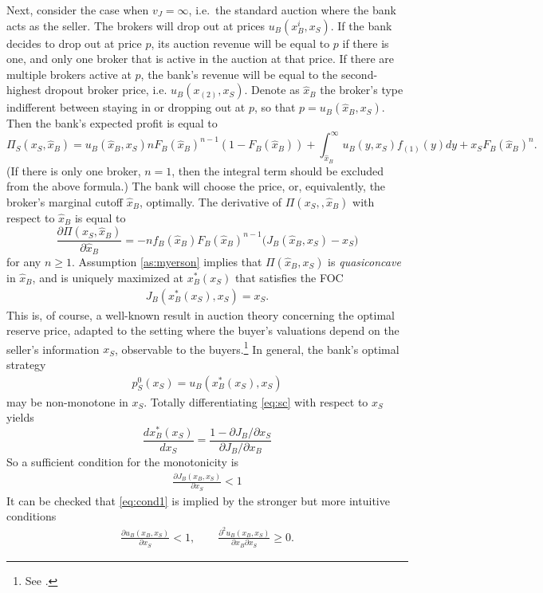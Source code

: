 \documentclass[11pt,twopage]{article}
\begin{document}
Next, consider the case when $v_J = \infty$, i.e.\ the standard auction where the bank acts as the seller. The brokers will drop out at prices $u_B(x_B^i,x_S)$. If the bank decides to drop out at price $p$, its auction revenue will be equal to $p$ if there is one, and only one broker that is active in the auction at that price. If there are multiple brokers active at $p$, the bank's revenue will be equal to the second-highest dropout broker price, i.e. $u_B(x_{(2)},x_S)$. Denote as $\hat x_B$ the broker's type indifferent between staying in or dropping out at $p$, so that $p = u_B(\hat x_B, x_S)$. Then the bank's expected profit is equal to 
\[ \Pi_S(x_S, \hat x_B) = u_B(\hat x_B,x_S) n F_B(\hat x_B)^{n-1} (1-F_B(\hat x_B)) 
+\int_{\hat x_B}^\infty u_B(y,x_S) f_{(1)}(y) dy
+x_S F_B(\hat x_B)^n.
\]
(If there is only one broker, $n=1$, then the integral term should be excluded from the above formula.) The bank will choose the price, or, equivalently, the broker's marginal cutoff $\hat x_B$, optimally. The derivative of $\Pi (x_S,,\hat x_B)$ with respect to $\hat x_B$ is equal to
\[ \frac{\partial \Pi (x_S,\hat x_B)}{\partial \hat x_B} = -nf_B(\hat x_B) F_B(\hat x_B)^{n-1} \Big ( J_B(\hat x_B,x_S) - x_S \Big)
\]
for any $n\geq 1$. Assumption \ref{as:myerson} implies that $\Pi (\hat x_B,x_S)$ is \emph{quasiconcave} in $\hat x_B$, and is uniquely maximized at $x_B^*(x_S)$ that satisfies the FOC 
\begin{align} J_B(x_B^*(x_S),x_S) = x_S . \label{eq:sc} \end{align}
This is, of course, a well-known result in auction theory concerning the optimal reserve price, adapted to the setting where the buyer's valuations depend on the seller's information $x_S$, observable to the buyers.\footnote{See \cite{myerson1981optimal}.}  In general, the bank's optimal strategy 
\begin{align}
p_S^0(x_S) = u_B(x_B^*(x_S), x_S) \label{eq:ps0-below-vJ}
\end{align}
may be non-monotone in $x_S$. Totally differentiating \eqref{eq:sc} with respect to $x_S$ yields
\[ \frac{d x_B^*(x_S)}{dx_S} = \frac{1-\partial J_B/\partial x_S}{\partial J_B/\partial x_B} \]
So a sufficient condition for the monotonicity is \begin{align}
\frac{\partial J_B(x_B,x_S)}{\partial x_S} < 1 \label{eq:cond1}
\end{align}
It can be checked that \eqref{eq:cond1} is implied by the stronger but more intuitive conditions
\begin{align}
\frac{\partial u_B(x_B,x_S)}{\partial x_S} <1,\quad \quad \frac{\partial^2 u_B(x_B,x_S)}{\partial x_B \partial x_S } \geq 0.
\label{eq:cond2}
\end{align}
\end{document}
